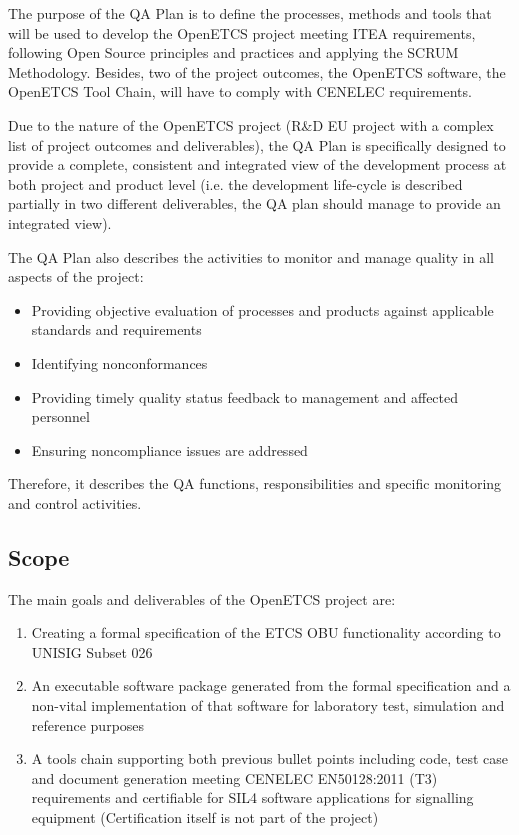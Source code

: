 \documentclass{template/openetcs_article}
\begin{document}
The purpose of the QA Plan is to define the processes, methods and tools that will be used to develop the OpenETCS project meeting ITEA requirements, following Open Source principles and practices and applying the SCRUM Methodology. Besides, two of the project outcomes, the OpenETCS software, the OpenETCS Tool Chain, will have to comply with CENELEC requirements.

Due to the nature of the OpenETCS project (R\&D EU project with a complex list of project outcomes and deliverables), the QA Plan is specifically designed to provide a complete, consistent and integrated view of the development process at both project and product level (i.e. the development life-cycle is described partially in two different deliverables, the QA plan should manage to provide an integrated view).

The QA Plan also describes the activities to monitor and manage quality in all aspects of the project:

\begin{itemize}
\item Providing objective evaluation of processes and products against applicable standards and requirements
\item Identifying nonconformances
\item Providing timely quality status feedback to management and affected personnel
\item Ensuring noncompliance issues are addressed
\end{itemize}

Therefore, it describes the QA functions, responsibilities and specific monitoring and control activities.


\subsection{Scope}



The main goals and deliverables of the OpenETCS project are:
\begin{enumerate}
\item Creating a formal specification of the ETCS OBU functionality according to UNISIG Subset 026

\item An executable software package generated from the formal specification and a non-vital implementation of that software for laboratory test, simulation and reference purposes

\item A tools chain supporting both previous bullet points including code, test case and document generation meeting CENELEC EN50128:2011 (T3) requirements and certifiable for SIL4 software applications for signalling equipment (Certification itself is not part of the project)
\end{enumerate}
\end{document}

